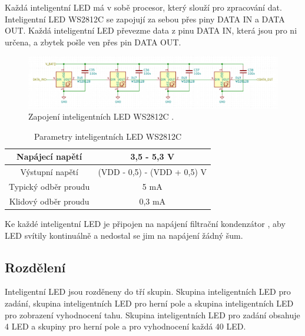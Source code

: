   Každá inteligentní LED má v sobě procesor, který slouží pro zpracování dat. 
  Inteligentní LED WS2812C se zapojují za sebou přes piny DATA IN a DATA OUT. Každá inteligentní LED převezme data z pinu 
  DATA IN, která jsou pro ni určena, a zbytek pošle ven přes pin DATA OUT.

  \begin{figure}[!h]
      \begin{center}
        \includegraphics[scale=0.5]{obrazky/WS2812C_spojeni.png}
      \end{center}
      \caption[Zapojení inteligentních LED WS2812C]{Zapojení inteligentních LED WS2812C \cite{WS2812C_datasheet}.}
  \end{figure}

  \begin{table}[!h]
    \caption{Parametry inteligentních LED WS2812C \cite{WS2812C_datasheet}}
    \begin{center}
        \begin{tabular}{|c|c|}
            \hline
            Napájecí napětí   & 3,5 - 5,3 V \\
            \hline
            Výstupní napětí   & (VDD - 0,5) - (VDD + 0,5) V \\
            \hline
            Typický odběr proudu & 5 mA \\
            \hline
            Klidový odběr proudu & 0,3 mA \\
            \hline
        \end{tabular}    
    \end{center}
  \end{table}

  Ke každé inteligentní LED je připojen na napájení filtrační kondenzátor \cite{WS2812C_datasheet}, aby LED svítily kontinuálně 
  a nedostal se jim na napájení žádný šum.

  \subsection{Rozdělení}
  Inteligentní LED jsou rozděneny do tří skupin. Skupina inteligentních LED pro zadání, skupina inteligentních LED pro herní pole 
  a skupina inteligentních LED pro zobrazení vyhodnocení tahu.
  Skupina inteligentních LED pro zadání obsahuje 4 LED a skupiny pro herní pole a pro vyhodnocení každá 40 LED.

